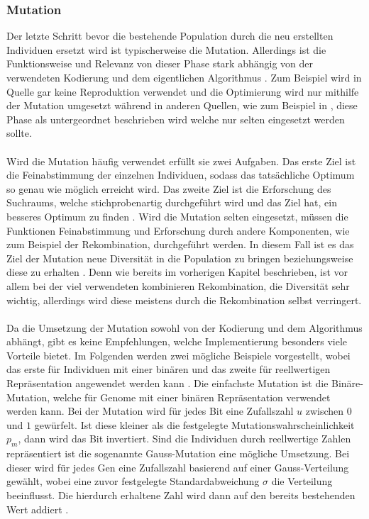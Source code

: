 \subsubsection{Mutation}
\label{subsubsec:ea_mutation}
Der letzte Schritt bevor die bestehende Population durch die neu erstellten Individuen ersetzt wird ist typischerweise die Mutation. Allerdings ist die Funktionsweise und Relevanz von dieser Phase stark abhängig von der verwendeten Kodierung und dem eigentlichen Algorithmus \cite{weicker2015evolutionare}. Zum Beispiel wird in Quelle \cite{such2017deep} gar keine Reproduktion verwendet und die Optimierung wird nur mithilfe der Mutation umgesetzt während in anderen Quellen, wie zum Beispiel in \cite{zoller2007kunstliche}, diese Phase als untergeordnet beschrieben wird welche nur selten eingesetzt werden sollte.
\\\\
Wird die Mutation häufig verwendet erfüllt sie zwei Aufgaben. Das erste Ziel ist die Feinabstimmung der einzelnen Individuen, sodass das tatsächliche Optimum so genau wie möglich erreicht wird. Das zweite Ziel ist die Erforschung des Suchraums, welche stichprobenartig durchgeführt wird und das Ziel hat, ein besseres Optimum zu finden \cite{weicker2015evolutionare}.  Wird die Mutation selten eingesetzt, müssen die Funktionen Feinabstimmung und Erforschung durch andere Komponenten, wie zum Beispiel der Rekombination, durchgeführt werden. In diesem Fall ist es das Ziel der Mutation neue Diversität in die Population zu bringen beziehungsweise diese zu erhalten \cite{weicker2015evolutionare}. Denn wie bereits im vorherigen Kapitel beschrieben, ist vor allem bei der viel verwendeten kombinieren Rekombination, die Diversität sehr wichtig, allerdings wird diese meistens durch die Rekombination selbst verringert.
\\\\
Da die Umsetzung der Mutation sowohl von der Kodierung und dem Algorithmus abhängt, gibt es keine Empfehlungen, welche Implementierung besonders viele Vorteile bietet. Im Folgenden werden zwei mögliche Beispiele vorgestellt, wobei das erste für Individuen mit einer binären und das zweite für reellwertigen Repräsentation angewendet werden kann \cite{weicker2015evolutionare}. Die einfachste Mutation ist die Binäre-Mutation, welche für Genome mit einer binären Repräsentation verwendet werden kann. Bei der Mutation wird für jedes Bit eine Zufallszahl $u$ zwischen $0$ und $1$ gewürfelt. Ist diese kleiner als die festgelegte Mutationswahrscheinlichkeit $p_m$, dann wird das Bit invertiert. Sind die Individuen durch reellwertige Zahlen repräsentiert ist die sogenannte Gauss-Mutation eine mögliche Umsetzung. Bei dieser wird für jedes Gen eine Zufallszahl basierend auf einer Gauss-Verteilung gewählt, wobei eine zuvor festgelegte Standardabweichung $\sigma$ die Verteilung beeinflusst. Die hierdurch erhaltene Zahl wird dann auf den bereits bestehenden Wert addiert \cite{weicker2015evolutionare}.

